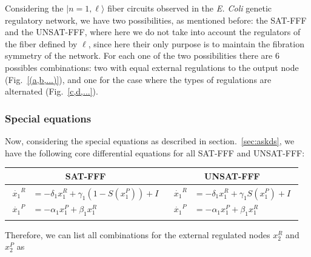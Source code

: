 Considering the $| n=1, \ell \rangle$ fiber circuits observed in 
the \textit{E. Coli} genetic regulatory network, we have two 
possibilities, as mentioned before: the SAT-FFF and the UNSAT-FFF,
where here we do not take into account the regulators of the fiber
defined by $\ell$, since here their only purpose is to maintain 
the fibration symmetry of the network. For each one of the two 
possibilities there are 6 possibles combinations: two with equal 
external regulations to the output node (Fig.~\ref{(a,b,...)}), 
and one for the case where the types of regulations are 
alternated (Fig.~\ref{c,d,...}).  

\subsubsection{Special equations}

Now, considering the special equations as described in 
section.~\ref{sec:askds}, we have the following core 
differential equations for all SAT-FFF and UNSAT-FFF:

{
    \setlength{\tabcolsep}{10pt}
    \renewcommand{\arraystretch}{3.0}
\begin{table}[H]
    \centering
    \vspace{0.2cm}
    \begin{tabular}{|c|c|}
        \hline
        \textbf{SAT-FFF} & \textbf{UNSAT-FFF} \\
        \hline
        $\begin{aligned}
            \dot{x_1}^R &= -\delta_1 x_1^R + \gamma_1(1-S(x_1^P)) + I\\
            \dot{x_1}^P &= -\alpha_1 x_1^P + \beta_1 x_1^R
        \end{aligned}$ & 
        $\begin{aligned}
            \dot{x_1}^R &= -\delta_1 x_1^R + \gamma_1 S(x_1^P) + I\\
            \dot{x_1}^P &= -\alpha_1 x_1^P + \beta_1 x_1^R
        \end{aligned}$ \\[0.25cm]
        \hline

    \end{tabular}
\end{table}
}

Therefore, we can list all combinations for the external regulated
nodes $x_2^R$ and $x_2^P$ as 

